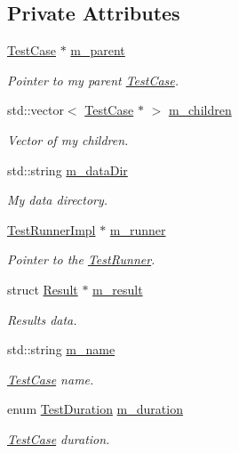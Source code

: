 \subsection*{Private Attributes}
\begin{DoxyCompactItemize}
\item 
\hyperlink{classns3_1_1TestCase}{Test\+Case} $\ast$ \hyperlink{classns3_1_1TestCase_a4b95b61d64e754a7e5720d1271e26b54}{m\+\_\+parent}
\begin{DoxyCompactList}\small\item\em Pointer to my parent \hyperlink{classns3_1_1TestCase}{Test\+Case}. \end{DoxyCompactList}\item 
std\+::vector$<$ \hyperlink{classns3_1_1TestCase}{Test\+Case} $\ast$ $>$ \hyperlink{classns3_1_1TestCase_a69a286c12a0d13ba6ea0968d4ffb7058}{m\+\_\+children}
\begin{DoxyCompactList}\small\item\em Vector of my children. \end{DoxyCompactList}\item 
std\+::string \hyperlink{classns3_1_1TestCase_a204d14ebe231588cf07d0dae9b56015a}{m\+\_\+data\+Dir}
\begin{DoxyCompactList}\small\item\em My data directory. \end{DoxyCompactList}\item 
\hyperlink{classns3_1_1TestRunnerImpl}{Test\+Runner\+Impl} $\ast$ \hyperlink{classns3_1_1TestCase_a8baa7a1fedd4916eb63c45a7597de67a}{m\+\_\+runner}
\begin{DoxyCompactList}\small\item\em Pointer to the \hyperlink{classns3_1_1TestRunner}{Test\+Runner}. \end{DoxyCompactList}\item 
struct \hyperlink{structns3_1_1TestCase_1_1Result}{Result} $\ast$ \hyperlink{classns3_1_1TestCase_addac5c48ae1626b527bb7d87155d2b4b}{m\+\_\+result}
\begin{DoxyCompactList}\small\item\em Results data. \end{DoxyCompactList}\item 
std\+::string \hyperlink{classns3_1_1TestCase_a0f7ecafa1c9cc538059169767453e4a4}{m\+\_\+name}
\begin{DoxyCompactList}\small\item\em \hyperlink{classns3_1_1TestCase}{Test\+Case} name. \end{DoxyCompactList}\item 
enum \hyperlink{classns3_1_1TestCase_a11f6f57c21a0d32e605d192a89550f91}{Test\+Duration} \hyperlink{classns3_1_1TestCase_a1437486460786c4bcb6ec5c45e067d9e}{m\+\_\+duration}
\begin{DoxyCompactList}\small\item\em \hyperlink{classns3_1_1TestCase}{Test\+Case} duration. \end{DoxyCompactList}\end{DoxyCompactItemize}
